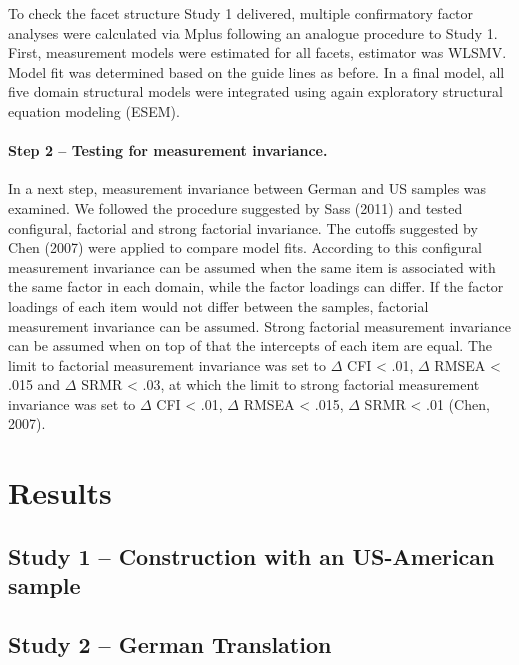 \documentclass[,man]{apa6}
\let\oldparagraph\paragraph
\renewcommand{\paragraph}[1]{\oldparagraph{#1}\mbox{}}
\theoremstyle{definition}
\theoremstyle{definition}
\theoremstyle{definition}
\theoremstyle{remark}
\begin{document}
To check the facet structure Study 1 delivered, multiple confirmatory
factor analyses were calculated via Mplus following an analogue
procedure to Study 1. First, measurement models were estimated for all
facets, estimator was WLSMV. Model fit was determined based on the guide
lines as before. In a final model, all five domain structural models
were integrated using again exploratory structural equation modeling
(ESEM).

\hypertarget{step-2-testing-for-measurement-invariance.}{%
\paragraph{Step 2 -- Testing for measurement
invariance.}\label{step-2-testing-for-measurement-invariance.}}

In a next step, measurement invariance between German and US samples was
examined. We followed the procedure suggested by Sass (2011) and tested
configural, factorial and strong factorial invariance. The cutoffs
suggested by Chen (2007) were applied to compare model fits. According
to this configural measurement invariance can be assumed when the same
item is associated with the same factor in each domain, while the factor
loadings can differ. If the factor loadings of each item would not
differ between the samples, factorial measurement invariance can be
assumed. Strong factorial measurement invariance can be assumed when on
top of that the intercepts of each item are equal. The limit to
factorial measurement invariance was set to \(\Delta\) CFI \textless{}
.01, \(\Delta\) RMSEA \textless{} .015 and \(\Delta\) SRMR \textless{}
.03, at which the limit to strong factorial measurement invariance was
set to \(\Delta\) CFI \textless{} .01, \(\Delta\) RMSEA \textless{}
.015, \(\Delta\) SRMR \textless{} .01 (Chen, 2007).

\hypertarget{results-1}{%
\section{Results}\label{results-1}}

\hypertarget{study-1-construction-with-an-us-american-sample}{%
\subsection{Study 1 -- Construction with an US-American
sample}\label{study-1-construction-with-an-us-american-sample}}

\hypertarget{study-2-german-translation-1}{%
\subsection{Study 2 -- German
Translation}\label{study-2-german-translation-1}}
\end{document}
